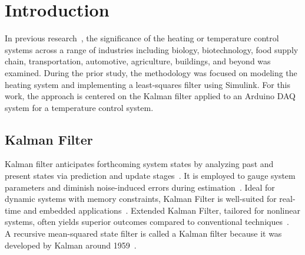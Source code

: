 \section{Introduction}
In previous research~\cite{obregon2024lsf}, the significance of the heating or temperature control systems across a range of industries including biology, biotechnology, food supply chain, transportation, automotive, agriculture, buildings, and beyond was examined. During the prior study, the methodology was focused on modeling the heating system and implementing a least-squares filter using Simulink. For this work, the approach is centered on the Kalman filter applied to an Arduino DAQ system for a temperature control system.

\subsection{Kalman Filter}
Kalman filter anticipates forthcoming system states by analyzing past and present states via prediction and update stages~\cite{kalman1960new}. It is employed to gauge system parameters and diminish noise-induced errors during estimation~\cite{bishop2001introduction}. Ideal for dynamic systems with memory constraints, Kalman Filter is well-suited for real-time and embedded applications~\cite{khodarahmi2023review}. Extended Kalman Filter, tailored for nonlinear systems, often yields superior outcomes compared to conventional techniques~\cite{khodarahmi2023review, lai2021novel}. \\

A recursive mean-squared state filter is called a Kalman filter because it was developed
by Kalman around 1959~\cite{mendel1995lessons}.



